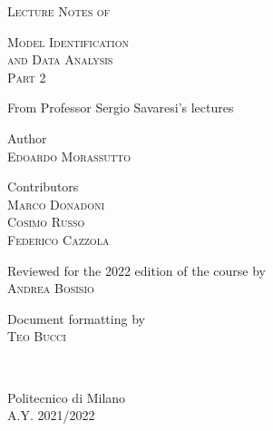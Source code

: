 \documentclass[10pt,a4paper,twoside]{book}
\begin{document}
\frontmatter

\pagestyle{empty}


\hypertarget{mytitlepage}{} %

\vspace*{\fill}
\begin{center}
	{\large \textsc{Lecture Notes of}}\\
	
  \vspace*{0.4cm}
	
  {\Huge
  \textsc{Model Identification}\\
	\vspace*{0.4cm}
	\textsc{and Data Analysis}}\\
	\vspace*{0.4cm}
	{\huge \textsc{Part 2}}\\
	
  \vspace*{1cm}
	
  {\large {From Professor Sergio Savaresi's lectures}}\\
	
  \vspace*{1cm}
	
  {\large
  Author\\
  \vspace*{0.1cm}
  \textsc{Edoardo Morassutto}\\
  
  \vspace*{0.4cm}
  
  Contributors\\
  \vspace*{0.1cm}
  \textsc{Marco Donadoni}\\
  \textsc{Cosimo Russo}\\
  \textsc{Federico Cazzola}\\
  
  \vspace*{0.4cm}
	
  Reviewed for the 2022 edition of the course by\\
  \vspace*{0.1cm}
  \textsc{Andrea Bosisio}\\

  \vspace*{0.4cm}
  
  Document formatting by\\
  \vspace*{0.1cm}
  \textsc{Teo Bucci}}\\
	
  \vspace*{1cm}
	
  Politecnico di Milano\\A.Y. 2021/2022
\end{center}
\vspace*{\fill}
\clearpage
\end{document}
